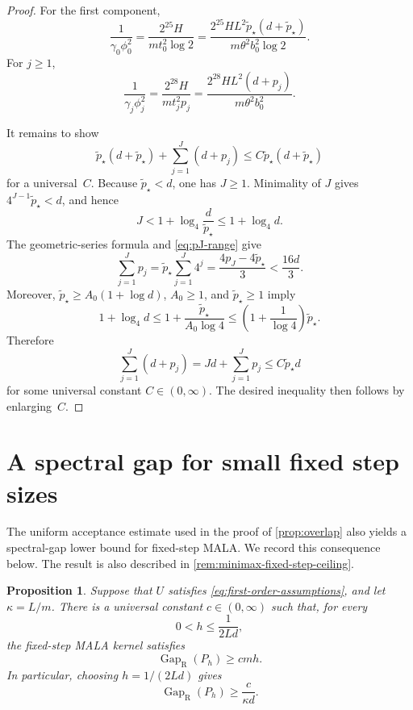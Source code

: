 \documentclass[11pt]{article}
\newtheorem{proposition}[proposition]{Proposition}
\newcommand{\Gap}{\operatorname{Gap}_{\mathrm{R}}}
\newcommand{\1}{\mathbf 1}
\begin{document}
	\begin{proof}
		For the first component,
		\[
		\frac1{\gamma_0\phi_0^2}
		=
		\frac{ 2^{25} H}{m t_0^2\log 2}
		=
		\frac{ 2^{25} HL^2 \widetilde p_\star (d+ \widetilde p_\star )}
		{m\theta^2b_0^2\log 2}.
		\]
		For \(j\geq1\),
		\[
		\frac1{\gamma_j\phi_j^2}
		=
		\frac{ 2^{28} H}{m t_j^2p_j}
		=
		\frac{ 2^{28} HL^2(d+p_j)}
		{m\theta^2b_0^2}.
		\]
		
		It remains to show
		\[
		\widetilde p_\star (d+ \widetilde p_\star ) + \sum_{j=1}^J (d+p_j) \leq C  \widetilde p_\star (d+ \widetilde p_\star )
		\]
		for a universal~$C$.
		Because \( \widetilde p_\star <d\), one
		has \(J\geq1\).  Minimality of \(J\) gives
		\(4^{J-1} \widetilde p_\star <d\), and hence
		\[
		J<1+\log_4\frac d{ \widetilde p_\star }
		\leq1+\log_4 d.
		\]
		The geometric-series formula and \eqref{eq:pJ-range} give
		\[
		\sum_{j=1}^Jp_j
		= \widetilde p_\star \sum_{j=1}^J4^j
		=\frac{4p_J-4 \widetilde p_\star }{3}
		<\frac{16d}{3}.
		\]
		Moreover, \( \widetilde p_\star \geq A_0(1+\log d)\),
		\(A_0\geq1\), and \( \widetilde p_\star \geq1\) imply
		\[
		1+\log_4 d
		\leq1+\frac{ \widetilde p_\star }{A_0\log4}
		\leq\left(1+\frac1{\log4}\right) \widetilde p_\star .
		\]
		Therefore
		\[
		\sum_{j=1}^J(d+p_j)
		=Jd+\sum_{j=1}^Jp_j
		\leq C  \widetilde p_\star  d
		\]
		for some universal constant $C \in (0,\infty)$.
		The desired inequality then follows by enlarging~$C$.
	\end{proof}
	
	
	\section{A spectral gap for small fixed step sizes}
	\label{app:small-fixed-step-gap}
	
	The uniform acceptance estimate used in the proof of
	\cref{prop:overlap} also yields a spectral-gap lower bound for
	fixed-step MALA. 
	We record this consequence below.
	The result is also described in \cref{rem:minimax-fixed-step-ceiling}.
	
	\begin{proposition}\label{prop:small-fixed-step-gap}
		Suppose that \(U\) satisfies
		\eqref{eq:first-order-assumptions}, and let \(\kappa=L/m\).
		There is a universal constant \(c\in(0,\infty)\) such that,
		for every
		\[
		0<h\leq\frac{1}{2Ld},
		\]
		the fixed-step MALA kernel satisfies
		\[
		\Gap(P_h)\geq cmh.
		\]
		In particular, choosing \(h=1/(2Ld)\) gives
		\[
		\Gap(P_h)\geq\frac{c}{\kappa d}.
		\]
	\end{proposition}
	
\end{document}
